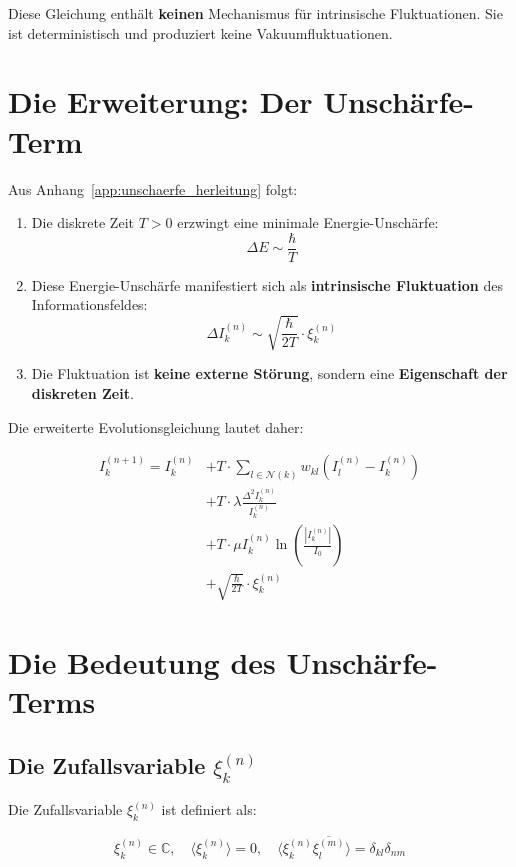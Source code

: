 Diese Gleichung enthält \textbf{keinen} Mechanismus für intrinsische Fluktuationen. Sie ist deterministisch und produziert keine Vakuumfluktuationen.

\section{Die Erweiterung: Der Unschärfe-Term}
\label{app:iwt_eq_erweiterung}

Aus Anhang~\ref{app:unschaerfe_herleitung} folgt:

\begin{enumerate}
    \item Die diskrete Zeit \( T > 0 \) erzwingt eine minimale Energie-Unschärfe:
          \[
          \Delta E \sim \frac{\hbar}{T}
          \]
    \item Diese Energie-Unschärfe manifestiert sich als \textbf{intrinsische Fluktuation} des Informationsfeldes:
          \[
          \Delta I_k^{(n)} \sim \sqrt{\frac{\hbar}{2T}} \cdot \xi_k^{(n)}
          \]
    \item Die Fluktuation ist \textbf{keine externe Störung}, sondern eine \textbf{Eigenschaft der diskreten Zeit}.
\end{enumerate}

Die erweiterte Evolutionsgleichung lautet daher:

\[
\boxed{
\begin{aligned}
I_k^{(n+1)} = I_k^{(n)} &+ T \cdot \sum_{l \in \mathcal{N}(k)} w_{kl} (I_l^{(n)} - I_k^{(n)}) \\
&+ T \cdot \lambda \frac{\Delta^2 I_k^{(n)}}{I_k^{(n)}} \\
&+ T \cdot \mu I_k^{(n)} \ln\left(\frac{|I_k^{(n)}|}{I_0}\right) \\
&+ \sqrt{\frac{\hbar}{2T}} \cdot \xi_k^{(n)}
\end{aligned}
}
\tag{P.2}
\]

\section{Die Bedeutung des Unschärfe-Terms}
\label{app:iwt_eq_bedeutung}

\subsection{Die Zufallsvariable \( \xi_k^{(n)} \)}

Die Zufallsvariable \( \xi_k^{(n)} \) ist definiert als:

\[
\xi_k^{(n)} \in \mathbb{C}, \quad
\langle \xi_k^{(n)} \rangle = 0, \quad
\langle \xi_k^{(n)} \overline{\xi_l^{(m)}} \rangle = \delta_{kl} \delta_{nm}
\]


